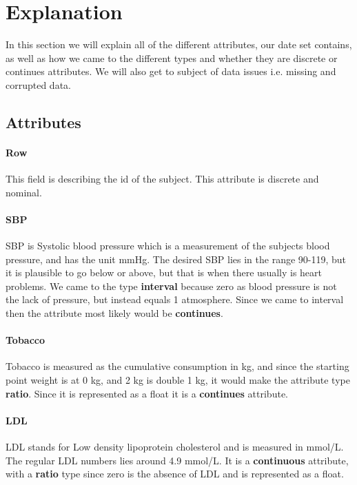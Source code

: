 \section{Explanation}

In this section we will explain all of the different attributes, our date set contains, as well as how we came to the different types and whether they are discrete or continues attributes. We will also get to subject of data issues i.e. missing and corrupted data.

\subsection{Attributes}

\paragraph{Row} This field is describing the id of the subject. This attribute is discrete and nominal.

\paragraph{SBP} SBP is Systolic blood pressure which is a measurement of the subjects blood pressure, and has the unit mmHg. The desired SBP lies in the range 90-119, but it is plausible to go below or above, but that is when there usually is heart problems.
We came to the type \textbf{interval} because zero as blood pressure is not the lack of pressure, but instead equals 1 atmosphere. Since we came to interval then the attribute most likely would be \textbf{continues}.

\paragraph{Tobacco} Tobacco is measured as the cumulative consumption in kg, and since the starting point weight is at 0 kg, and 2 kg is double 1 kg, it would make the attribute type \textbf{ratio}. Since it is represented as a float it is a \textbf{continues} attribute.

\paragraph{LDL} LDL stands for Low density lipoprotein cholesterol and is measured in mmol/L. The regular LDL numbers lies around 4.9 mmol/L. It is a \textbf{continuous} attribute, with a \textbf{ratio} type since zero is the absence of LDL and is  represented as a float.


